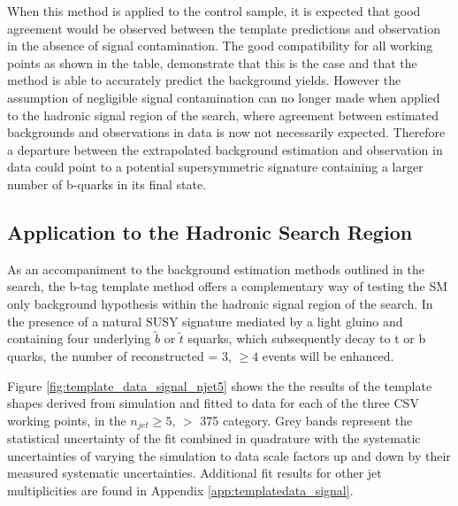 When this method is applied to the \mupjets control sample, it is expected that good agreement would be observed between the template predictions and observation in the absence of signal contamination. The good compatibility for all working points as shown in the table, demonstrate that this is the case and that the method is able to accurately predict the background yields. However the assumption of negligible signal contamination can no longer made when applied to the hadronic signal region of the \alphat search, where agreement between estimated backgrounds and observations in data is now not necessarily expected. Therefore a departure between the extrapolated background estimation and observation in data could point to a potential supersymmetric signature containing a larger number of b-quarks in its final state.
 
\subsection{Application to the \alphat Hadronic Search Region}
\label{subsec:templatedataresults}

As an accompaniment to the background estimation methods outlined in the \alphat search, the b-tag template method offers a complementary way of testing the \ac{SM} only background hypothesis within the hadronic signal region of the search. In the presence of a natural \ac{SUSY} signature mediated by a light gluino and containing four underlying $\widetilde{b}$ or $\widetilde{t}$ squarks, which subsequently decay to t or b quarks, the number of reconstructed \nbreco = 3, $\geq 4$ events will be enhanced.

Figure \ref{fig:template_data_signal_njet5} shows the  the results of the template shapes derived from simulation and fitted to data for each of the three \ac{CSV} working points, in the $n_{jet} \geq 5$, \theht $>$ 375 \GeV category.  Grey bands represent the statistical uncertainty of the fit combined in quadrature with the systematic uncertainties of varying the simulation to data scale factors up and down by their measured systematic uncertainties.  Additional fit results for other jet multiplicities are found in Appendix \ref{app:templatedata_signal}.

\vspace*{100px}

